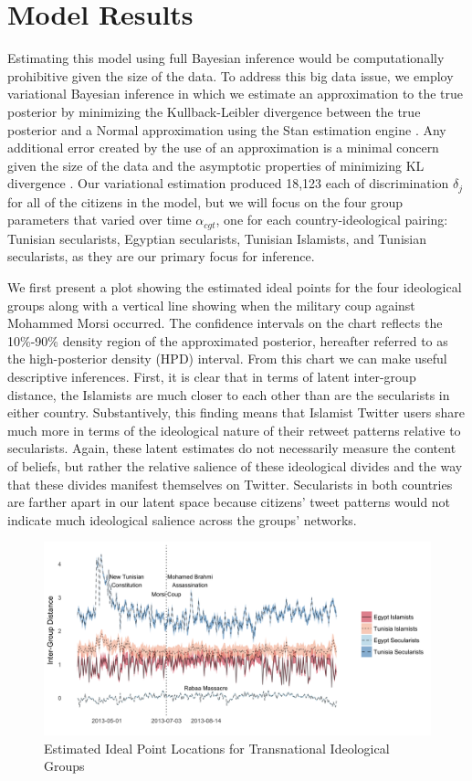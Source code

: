 \documentclass[12pt]{article}
\begin{document}
\section*{Model Results}

Estimating this model using full Bayesian inference would be computationally prohibitive given the size of the data. To address this big data issue, we employ variational Bayesian inference in which we estimate an approximation to the true posterior by minimizing the Kullback-Leibler divergence between the true posterior and a Normal approximation using the Stan estimation engine \parencite{NIPS2015_5758}. Any additional error created by the use of an approximation is a minimal concern given the size of the data and the asymptotic properties of minimizing KL divergence \parencite{grimmer2011,NIPS2015_5758}. Our variational estimation produced 18,123 each of discrimination $\delta_j$ for all of the citizens in the model, but we will focus on the four group parameters that varied over time $\alpha_{cgt}$, one for each country-ideological pairing: Tunisian secularists, Egyptian secularists, Tunisian Islamists, and Tunisian secularists, as they are our primary focus for inference.

We first present a plot showing the estimated ideal points for the four ideological groups along with a vertical line showing when the military coup against Mohammed Morsi occurred. The confidence intervals on the chart reflects the 10\%-90\% density region of the approximated posterior, hereafter referred to as the high-posterior density (HPD) interval. From this chart we can make useful descriptive inferences. First, it is clear that in terms of latent inter-group distance, the Islamists are much closer to each other than are the secularists in either country. Substantively, this finding means that Islamist Twitter users share much more in terms of the ideological nature of their retweet patterns relative to secularists. Again, these latent estimates do not necessarily measure the content of beliefs, but rather the relative salience of these ideological divides and the way that these divides manifest themselves on Twitter. Secularists in both countries are farther apart in our latent space because citizens' tweet patterns would not indicate much ideological salience across the groups' networks. 
 \begin{figure}[!h]
 	\centering
	\caption{Estimated Ideal Point Locations for Transnational Ideological Groups}\label{arab_id_facet}
	\centering
	\includegraphics[width=.9\linewidth]{arab_ideology}
\end{figure}
\end{document}
